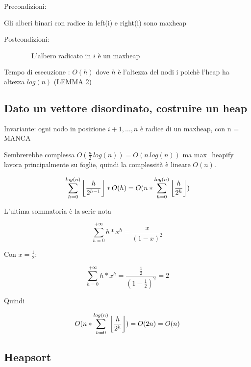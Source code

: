{Precondizioni:}

{Gli alberi binari con radice in left(i) e right(i) sono maxheap}

{Postcondizioni:}

{~~~~~~~~L'albero radicato in $i$ è un maxheap}



{Tempo di esecuzione : $O(h)$ dove $h$ è l'altezza del nodi i poichè l'heap ha altezza $log(n)$ (LEMMA 2)}

\subsection{Dato un vettore disordinato, costruire un heap}



{Invariante: ogni nodo in posizione $i+1,\ldots,n$ è radice di un maxheap, con n = MANCA}

{Sembrerebbe complessa $O(\frac{n}{2}\,log(n)) = O(n\,log(n))$ ma max\_heapify lavora principalmente su foglie, quindi la complessità è lineare $O(n)$.}

\begin{equation}
\sum_{h=0}^{log(n)}{\floor*{\frac{h}{2^{h-1}}}*O(h)} = O(n*\sum_{h=0}^{log(n)}{\floor*{\frac{h}{2^h}})}
\end{equation}

{L'ultima sommatoria è la serie nota}

\begin{equation}
\sum_{h=0}^{+\infty}{h*x^h} = \frac{x}{{(1-x)}^2}
\end{equation}

{Con $x=\frac{1}{2}$:}

\begin{equation}
\sum_{h=0}^{+\infty}{h*x^h} = \frac{\frac{1}{2}}{{(1-\frac{1}{2})}^2} = 2
\end{equation}

{Quindi}

\begin{equation}
O(n*\sum_{h=0}^{log(n)}{\floor*{\frac{h}{2^h}}}) = O(2n) = O(n)
\end{equation}

\subsection{Heapsort}



